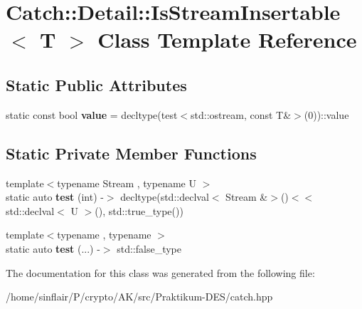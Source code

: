 \hypertarget{classCatch_1_1Detail_1_1IsStreamInsertable}{}\section{Catch\+:\+:Detail\+:\+:Is\+Stream\+Insertable$<$ T $>$ Class Template Reference}
\label{classCatch_1_1Detail_1_1IsStreamInsertable}
\subsection*{Static Public Attributes}
\begin{DoxyCompactItemize}
\item 
\mbox{\label{classCatch_1_1Detail_1_1IsStreamInsertable_a42818b09ae5851126a70ee263769e309}} 
static const bool {\bfseries value} = decltype(test$<$std\+::ostream, const T\&$>$(0))\+::value
\end{DoxyCompactItemize}
\subsection*{Static Private Member Functions}
\begin{DoxyCompactItemize}
\item 
\mbox{\label{classCatch_1_1Detail_1_1IsStreamInsertable_a921c9480534008707cc6bbe5545acffe}} 
{\footnotesize template$<$typename Stream , typename U $>$ }\\static auto {\bfseries test} (int) -\/$>$ decltype(std\+::declval$<$ Stream \&$>$()$<$$<$ std\+::declval$<$ U $>$(), std\+::true\+\_\+type())
\item 
\mbox{\label{classCatch_1_1Detail_1_1IsStreamInsertable_ac5761375646929916dc5e165d44cd3d9}} 
{\footnotesize template$<$typename , typename $>$ }\\static auto {\bfseries test} (...) -\/$>$ std\+::false\+\_\+type
\end{DoxyCompactItemize}


The documentation for this class was generated from the following file\+:\begin{DoxyCompactItemize}
\item 
/home/sinflair/\+P/crypto/\+A\+K/src/\+Praktikum-\/\+D\+E\+S/catch.\+hpp\end{DoxyCompactItemize}
